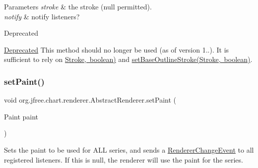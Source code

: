 \begin{DoxyParams}{Parameters}
{\em stroke} & the stroke ({\ttfamily null} permitted). \\
\hline
{\em notify} & notify listeners?\\
\hline
\end{DoxyParams}
\begin{DoxyRefDesc}{Deprecated}
\item[\mbox{\hyperlink{deprecated__deprecated000125}{Deprecated}}]This method should no longer be used (as of version 1..). It is sufficient to rely on \mbox{\hyperlink{}{Stroke, boolean)}} and \mbox{\hyperlink{classorg_1_1jfree_1_1chart_1_1renderer_1_1_abstract_renderer_ae9b788eee2ee4506c4fe4dd219465dbb}{set\+Base\+Outline\+Stroke(\+Stroke, boolean)}}. \end{DoxyRefDesc}
\mbox{\label{classorg_1_1jfree_1_1chart_1_1renderer_1_1_abstract_renderer_ad01b6bfce0066f4bbfd699c22aff7c88}} 
\subsubsection{\texorpdfstring{set\+Paint()}{setPaint()}\hspace{0.1cm}{\footnotesize\ttfamily [1/2]}}
{\footnotesize\ttfamily void org.\+jfree.\+chart.\+renderer.\+Abstract\+Renderer.\+set\+Paint (\begin{DoxyParamCaption}\item[{Paint}]{paint }\end{DoxyParamCaption})}

Sets the paint to be used for A\+LL series, and sends a \mbox{\hyperlink{}{Renderer\+Change\+Event}} to all registered listeners. If this is {\ttfamily null}, the renderer will use the paint for the series.


